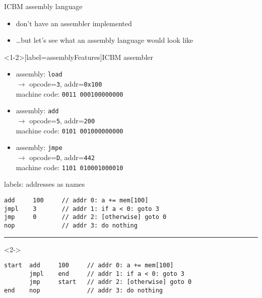 \begin{frame}{ICBM assembly language}
    \begin{itemize}
    \item don't have an assembler implemented
    \item \ldots but let's see what an assembly language would look like
    \end{itemize}
\end{frame}

\begin{frame}<1-2>[label=assemblyFeatures]{ICBM assembler}
    \begin{itemize}
    \item assembly: {\tt load } \\ $\rightarrow$ opcode={\tt 3}, addr={\tt0x100} \\
        machine code: {\tt 0011 000100000000} \\
    \item assembly: {\tt add } \\ $\rightarrow$ opcode={\tt 5}, addr={\tt 200} \\
        machine code: {\tt 0101 001000000000} \\
    \item assembly: {\tt jmpe } \\ $\rightarrow$ opcode={\tt D}, addr={\tt 442} \\
        machine code: {\tt 1101 010001000010}\\
    \end{itemize}
\end{frame}

\begin{frame}[fragile,label=addrAsName]{labels: addresses as names}
\begin{lstlisting}[language=myasm]
add     100     // addr 0: a += mem[100]
jmpl    3       // addr 1: if a < 0: goto 3
jmp     0       // addr 2: [otherwise] goto 0
nop             // addr 3: do nothing
\end{lstlisting}
\hrule
\begin{visibleenv}<2->
\begin{lstlisting}[language=myasm]
start  add     100     // addr 0: a += mem[100]
       jmpl    end     // addr 1: if a < 0: goto 3
       jmp     start   // addr 2: [otherwise] goto 0
end    nop             // addr 3: do nothing
\end{lstlisting}
\end{visibleenv}
\end{frame}

